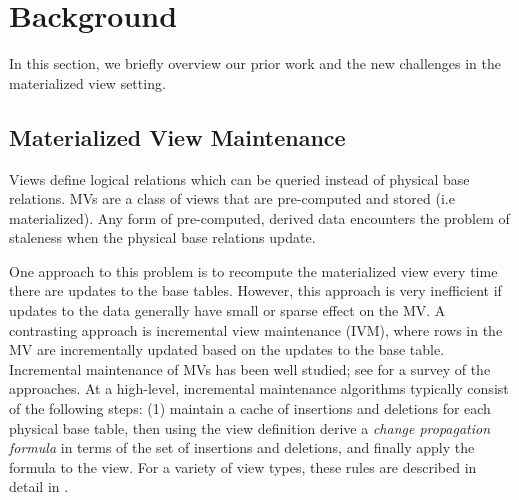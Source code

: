 \section{Background}\label{sec-background}
In this section, we briefly overview our prior work and the new challenges in the materialized view setting.


\iffalse
\subsection{Materialized View Maintenance}\label{subsec-inc}
Views define logical relations which can be queried instead of physical base relations.
MVs are a class of views that are pre-computed and stored (i.e materialized).
Any form of pre-computed, derived data encounters the problem of staleness when the physical base relations update.

One approach to this problem is to recompute the materialized view every time there are updates to the base tables.
However, this approach is very inefficient if updates to the data generally have small or sparse effect on the MV. 
A contrasting approach is incremental view maintenance (IVM), where rows in the MV are incrementally updated based on the updates to the base table.
Incremental maintenance of MVs has been well studied; see \cite{chirkova2011materialized} for a survey of the approaches. 
At a high-level, incremental maintenance algorithms typically consist of the following steps: (1) maintain a cache of insertions and deletions for each physical base table, then using the view definition derive a \emph{change propagation formula} in terms of the set of insertions and deletions, and finally apply the formula to the view.
For a variety of view types, these rules are described in detail in \cite{DBLP:journals/vldb/KochAKNNLS14, DBLP:conf/pods/Koch10}.


